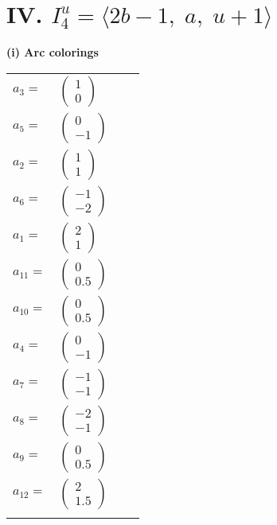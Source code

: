 \documentclass[1p]{elsarticle_modified}
\theoremstyle{definition}
\begin{document}
\centering \section*{IV. $I^u_{4}= \langle 2 b-1,\;a,\;u+1 \rangle$}
\flushleft \textbf{(i) Arc colorings}\\
\begin{tabular}{m{7pt} m{180pt} m{7pt} m{180pt} }
\flushright $a_{3}=$&$\begin{pmatrix}1\\0\end{pmatrix}$ \\
\flushright $a_{5}=$&$\begin{pmatrix}0\\-1\end{pmatrix}$ \\
\flushright $a_{2}=$&$\begin{pmatrix}1\\1\end{pmatrix}$ \\
\flushright $a_{6}=$&$\begin{pmatrix}-1\\-2\end{pmatrix}$ \\
\flushright $a_{1}=$&$\begin{pmatrix}2\\1\end{pmatrix}$ \\
\flushright $a_{11}=$&$\begin{pmatrix}0\\0.5\end{pmatrix}$ \\
\flushright $a_{10}=$&$\begin{pmatrix}0\\0.5\end{pmatrix}$ \\
\flushright $a_{4}=$&$\begin{pmatrix}0\\-1\end{pmatrix}$ \\
\flushright $a_{7}=$&$\begin{pmatrix}-1\\-1\end{pmatrix}$ \\
\flushright $a_{8}=$&$\begin{pmatrix}-2\\-1\end{pmatrix}$ \\
\flushright $a_{9}=$&$\begin{pmatrix}0\\0.5\end{pmatrix}$ \\
\flushright $a_{12}=$&$\begin{pmatrix}2\\1.5\end{pmatrix}$\\&\end{tabular}
\end{document}
